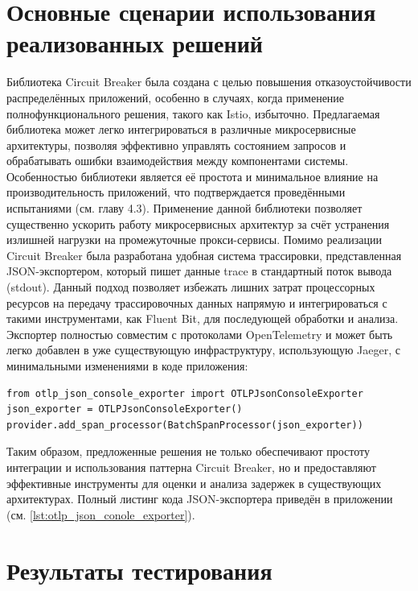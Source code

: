 \section{Основные сценарии использования реализованных решений}
Библиотека Circuit Breaker была создана с целью повышения отказоустойчивости распределённых приложений, особенно в случаях, когда применение полнофункционального решения, такого как Istio, избыточно. Предлагаемая библиотека может легко интегрироваться в различные микросервисные архитектуры, позволяя эффективно управлять состоянием запросов и обрабатывать ошибки взаимодействия между компонентами системы.
Особенностью библиотеки является её простота и минимальное влияние на производительность приложений, что подтверждается проведёнными испытаниями (см. главу 4.3). Применение данной библиотеки позволяет существенно ускорить работу микросервисных архитектур за счёт устранения излишней нагрузки на промежуточные прокси-сервисы.
Помимо реализации Circuit Breaker была разработана удобная система трассировки, представленная JSON-экспортером, который пишет данные trace в стандартный поток вывода (stdout). Данный подход позволяет избежать лишних затрат процессорных ресурсов на передачу трассировочных данных напрямую и интегрироваться с такими инструментами, как Fluent Bit, для последующей обработки и анализа. Экспортер полностью совместим с протоколами OpenTelemetry и может быть легко добавлен в уже существующую инфраструктуру, использующую Jaeger, с минимальными изменениями в коде приложения:
\begin{verbatim}
from otlp_json_console_exporter import OTLPJsonConsoleExporter
json_exporter = OTLPJsonConsoleExporter()
provider.add_span_processor(BatchSpanProcessor(json_exporter))
\end{verbatim}
Таким образом, предложенные решения не только обеспечивают простоту интеграции и использования паттерна Circuit Breaker, но и предоставляют эффективные инструменты для оценки и анализа задержек в существующих архитектурах. Полный листинг кода JSON-экспортера приведён в приложении (см. \ref{lst:otlp_json_conole_exporter}).


\section{Результаты тестирования}

